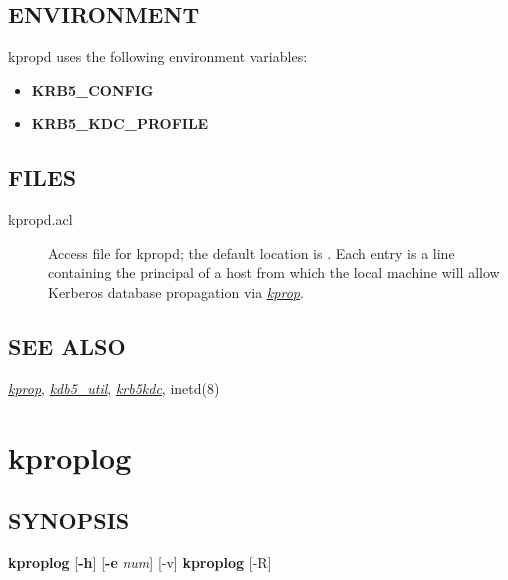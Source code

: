 \documentclass[letterpaper,10pt,english]{sphinxmanual}
\begin{document}
\subsection{ENVIRONMENT}
\label{admin/admin_commands/kpropd:environment}
kpropd uses the following environment variables:
\begin{itemize}
\item {} 
\textbf{KRB5\_CONFIG}

\item {} 
\textbf{KRB5\_KDC\_PROFILE}

\end{itemize}


\subsection{FILES}
\label{admin/admin_commands/kpropd:files}\begin{description}
\item[{kpropd.acl}] \leavevmode
Access file for kpropd; the default location is
.  Each entry is a line
containing the principal of a host from which the local machine
will allow Kerberos database propagation via {\hyperref[admin/admin_commands/kprop:kprop-8]{\emph{kprop}}}.

\end{description}


\subsection{SEE ALSO}
\label{admin/admin_commands/kpropd:see-also}
{\hyperref[admin/admin_commands/kprop:kprop-8]{\emph{kprop}}}, {\hyperref[admin/admin_commands/kdb5_util:kdb5-util-8]{\emph{kdb5\_util}}}, {\hyperref[admin/admin_commands/krb5kdc:krb5kdc-8]{\emph{krb5kdc}}}, inetd(8)


\section{kproplog}
\label{admin/admin_commands/kproplog:kproplog}\label{admin/admin_commands/kproplog:kproplog-8}\label{admin/admin_commands/kproplog::doc}

\subsection{SYNOPSIS}
\label{admin/admin_commands/kproplog:synopsis}
\textbf{kproplog} {[}\textbf{-h}{]} {[}\textbf{-e} \emph{num}{]} {[}-v{]}
\textbf{kproplog} {[}-R{]}
\end{document}
